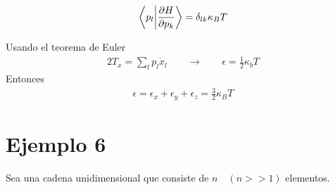 \documentclass{article}
\begin{document}
\begin{gather*}
  \bra{p_l }\ket{\frac{\partial H  }{\partial p_k }} = \delta _{lk }  \kappa_B T  
\end{gather*}

Usando el teorema de Euler 
\begin{gather*}
  2 T_x = \displaystyle\sum_{l }^{ } p_l \dot x_l \qquad \rightarrow \qquad \epsilon = \frac{1}{2} \kappa_b T  
\end{gather*}
Entonces 
\begin{gather*}
  \epsilon = \epsilon_x + \epsilon_y + \epsilon_z = \frac{3}{2}\kappa_B T 
\end{gather*}

\section{Ejemplo 6 }
Sea una cadena unidimensional que consiste de $ n \quad (n >> 1) $ elementos.
\end{document}
